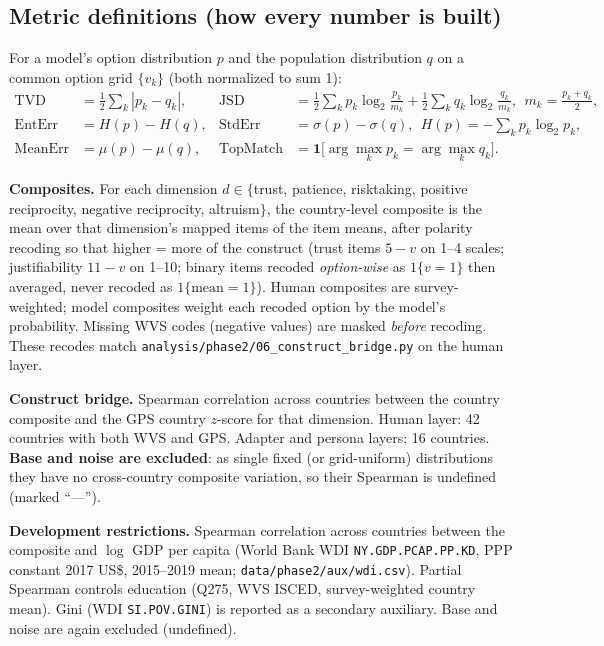 \documentclass[11pt]{article}
\begin{document}
\subsection{Metric definitions (how every number is built)}
\label{sec:metrics}
For a model's option distribution $p$ and the population distribution $q$ on a common option grid $\{v_k\}$ (both normalized to sum 1):
\begin{align}
\mathrm{TVD} &= \tfrac{1}{2}\textstyle\sum_k |p_k-q_k|, &
\mathrm{JSD} &= \tfrac{1}{2}\textstyle\sum_k p_k\log_2\tfrac{p_k}{m_k}+\tfrac{1}{2}\textstyle\sum_k q_k\log_2\tfrac{q_k}{m_k},\ \ m_k=\tfrac{p_k+q_k}{2}, \nonumber\\[3pt]
\mathrm{EntErr} &= H(p)-H(q), &
\mathrm{StdErr} &= \sigma(p)-\sigma(q),\ \ H(p)=-\textstyle\sum_k p_k\log_2 p_k, \nonumber\\[3pt]
\mathrm{MeanErr} &= \mu(p)-\mu(q), &
\mathrm{TopMatch} &= \mathbf{1}\bigl[\arg\max_k p_k=\arg\max_k q_k\bigr]. \nonumber
\end{align}

\textbf{Composites.} For each dimension $d \in \{$trust, patience, risktaking, positive reciprocity, negative reciprocity, altruism$\}$, the country-level composite is the mean over that dimension's mapped items of the item means, after polarity recoding so that higher = more of the construct (trust items $5-v$ on 1--4 scales; justifiability $11-v$ on 1--10; binary items recoded \emph{option-wise} as $1\{v=1\}$ then averaged, never recoded as $1\{\mathrm{mean}=1\}$). Human composites are survey-weighted; model composites weight each recoded option by the model's probability. Missing WVS codes (negative values) are masked \emph{before} recoding. These recodes match \texttt{analysis/phase2/06\_construct\_bridge.py} on the human layer.

\textbf{Construct bridge.} Spearman correlation across countries between the country composite and the GPS country $z$-score for that dimension. Human layer: 42 countries with both WVS and GPS. Adapter and persona layers: 16 countries. \textbf{Base and noise are excluded}: as single fixed (or grid-uniform) distributions they have no cross-country composite variation, so their Spearman is undefined (marked ``---'').

\textbf{Development restrictions.} Spearman correlation across countries between the composite and $\log$ GDP per capita (World Bank WDI \texttt{NY.GDP.PCAP.PP.KD}, PPP constant 2017 US\$, 2015--2019 mean; \texttt{data/phase2/aux/wdi.csv}). Partial Spearman controls education (Q275, WVS ISCED, survey-weighted country mean). Gini (WDI \texttt{SI.POV.GINI}) is reported as a secondary auxiliary. Base and noise are again excluded (undefined).
\end{document}
